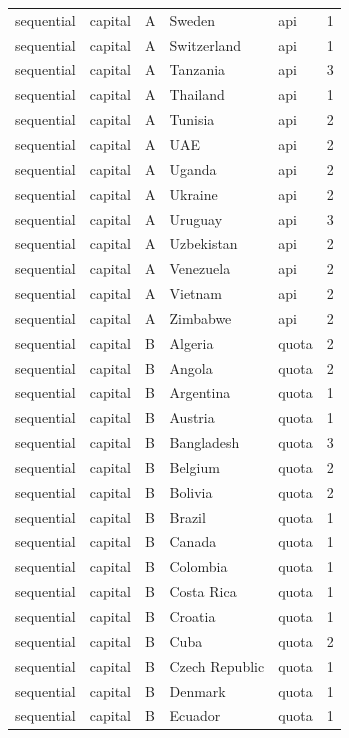\begin{tabular}{lllllr}
sequential & capital & A & Sweden & api & 1 \\
sequential & capital & A & Switzerland & api & 1 \\
sequential & capital & A & Tanzania & api & 3 \\
sequential & capital & A & Thailand & api & 1 \\
sequential & capital & A & Tunisia & api & 2 \\
sequential & capital & A & UAE & api & 2 \\
sequential & capital & A & Uganda & api & 2 \\
sequential & capital & A & Ukraine & api & 2 \\
sequential & capital & A & Uruguay & api & 3 \\
sequential & capital & A & Uzbekistan & api & 2 \\
sequential & capital & A & Venezuela & api & 2 \\
sequential & capital & A & Vietnam & api & 2 \\
sequential & capital & A & Zimbabwe & api & 2 \\
sequential & capital & B & Algeria & quota & 2 \\
sequential & capital & B & Angola & quota & 2 \\
sequential & capital & B & Argentina & quota & 1 \\
sequential & capital & B & Austria & quota & 1 \\
sequential & capital & B & Bangladesh & quota & 3 \\
sequential & capital & B & Belgium & quota & 2 \\
sequential & capital & B & Bolivia & quota & 2 \\
sequential & capital & B & Brazil & quota & 1 \\
sequential & capital & B & Canada & quota & 1 \\
sequential & capital & B & Colombia & quota & 1 \\
sequential & capital & B & Costa Rica & quota & 1 \\
sequential & capital & B & Croatia & quota & 1 \\
sequential & capital & B & Cuba & quota & 2 \\
sequential & capital & B & Czech Republic & quota & 1 \\
sequential & capital & B & Denmark & quota & 1 \\
sequential & capital & B & Ecuador & quota & 1 \\

\end{tabular}
